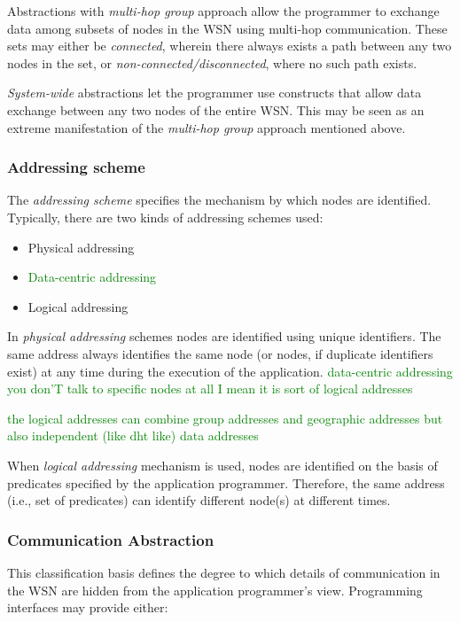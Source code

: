 Abstractions with \emph{multi-hop group} approach allow the
  programmer to exchange data among subsets of nodes in the WSN using
  multi-hop communication. These sets may either be
  \emph{connected}, wherein there always exists a path between any two nodes in
  the set, or \emph{non-connected/disconnected}, where no such path
  exists.

\emph{System-wide} abstractions let the
  programmer use constructs that allow data exchange between any two nodes
  of the entire WSN. This may be seen as an extreme manifestation of the
  \emph{multi-hop group} approach mentioned above.

\subsubsection{Addressing scheme}

The \emph{addressing scheme} specifies the mechanism by which nodes are
identified. Typically, there are two kinds of addressing schemes used:

\begin{itemize}
  \item Physical addressing
  \item \textcolor{green}{Data-centric addressing}
  \item Logical addressing
\end{itemize}

In \emph{physical addressing} schemes nodes are identified using unique 
  identifiers. The same address always identifies the same node (or nodes, if
  duplicate  identifiers exist) at any time during the execution of the
  application.
\textcolor{green}{data-centric addressing you don'T talk to specific nodes at all I mean it is sort of logical addresses} 

\textcolor{green}{the logical addresses can combine group addresses and geographic addresses but also independent (like dht like) data addresses }

When \emph{logical addressing} mechanism is used, nodes are identified on the
basis of predicates specified by the application programmer. Therefore, the same
  address (i.e., set of predicates) can identify different node(s) at different
  times.

\subsubsection{Communication Abstraction}

This classification basis defines the degree to which details of communication
in the WSN are hidden from the application programmer's view. Programming
interfaces may provide either:

